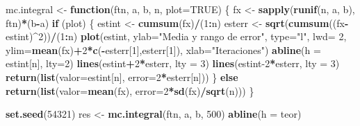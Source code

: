 \documentclass[
]{book}
\newenvironment{Shaded}{\begin{snugshade}}{\end{snugshade}}
\newcommand{\ControlFlowTok}[1]{\textcolor[rgb]{0.13,0.29,0.53}{\textbf{#1}}}
\newcommand{\DataTypeTok}[1]{\textcolor[rgb]{0.13,0.29,0.53}{#1}}
\newcommand{\DecValTok}[1]{\textcolor[rgb]{0.00,0.00,0.81}{#1}}
\newcommand{\KeywordTok}[1]{\textcolor[rgb]{0.13,0.29,0.53}{\textbf{#1}}}
\newcommand{\NormalTok}[1]{#1}
\newcommand{\OperatorTok}[1]{\textcolor[rgb]{0.81,0.36,0.00}{\textbf{#1}}}
\newcommand{\OtherTok}[1]{\textcolor[rgb]{0.56,0.35,0.01}{#1}}
\newcommand{\StringTok}[1]{\textcolor[rgb]{0.31,0.60,0.02}{#1}}
\theoremstyle{break}
\theoremstyle{definition}
\theoremstyle{definition}
\theoremstyle{definition}
\theoremstyle{remark}
\begin{document}
\begin{Shaded}
\begin{Highlighting}[]
\NormalTok{mc.integral <-}\StringTok{ }\ControlFlowTok{function}\NormalTok{(ftn, a, b, n, }\DataTypeTok{plot=}\OtherTok{TRUE}\NormalTok{) \{}
\NormalTok{  fx <-}\StringTok{ }\KeywordTok{sapply}\NormalTok{(}\KeywordTok{runif}\NormalTok{(n, a, b), ftn)}\OperatorTok{*}\NormalTok{(b}\OperatorTok{-}\NormalTok{a)}
  \ControlFlowTok{if}\NormalTok{ (plot) \{}
\NormalTok{    estint <-}\StringTok{ }\KeywordTok{cumsum}\NormalTok{(fx)}\OperatorTok{/}\NormalTok{(}\DecValTok{1}\OperatorTok{:}\NormalTok{n)}
\NormalTok{    esterr <-}\StringTok{ }\KeywordTok{sqrt}\NormalTok{(}\KeywordTok{cumsum}\NormalTok{((fx}\OperatorTok{-}\NormalTok{estint)}\OperatorTok{^}\DecValTok{2}\NormalTok{))}\OperatorTok{/}\NormalTok{(}\DecValTok{1}\OperatorTok{:}\NormalTok{n)}
    \KeywordTok{plot}\NormalTok{(estint, }\DataTypeTok{ylab=}\StringTok{"Media y rango de error"}\NormalTok{, }\DataTypeTok{type=}\StringTok{"l"}\NormalTok{, }\DataTypeTok{lwd=} \DecValTok{2}\NormalTok{, }
         \DataTypeTok{ylim=}\KeywordTok{mean}\NormalTok{(fx)}\OperatorTok{+}\DecValTok{2}\OperatorTok{*}\KeywordTok{c}\NormalTok{(}\OperatorTok{-}\NormalTok{esterr[}\DecValTok{1}\NormalTok{],esterr[}\DecValTok{1}\NormalTok{]), }\DataTypeTok{xlab=}\StringTok{"Iteraciones"}\NormalTok{)}
    \KeywordTok{abline}\NormalTok{(}\DataTypeTok{h =}\NormalTok{ estint[n], }\DataTypeTok{lty=}\DecValTok{2}\NormalTok{)}
    \KeywordTok{lines}\NormalTok{(estint}\OperatorTok{+}\DecValTok{2}\OperatorTok{*}\NormalTok{esterr, }\DataTypeTok{lty =} \DecValTok{3}\NormalTok{)}
    \KeywordTok{lines}\NormalTok{(estint}\DecValTok{-2}\OperatorTok{*}\NormalTok{esterr, }\DataTypeTok{lty =} \DecValTok{3}\NormalTok{)}
    \KeywordTok{return}\NormalTok{(}\KeywordTok{list}\NormalTok{(}\DataTypeTok{valor=}\NormalTok{estint[n], }\DataTypeTok{error=}\DecValTok{2}\OperatorTok{*}\NormalTok{esterr[n]))  }
\NormalTok{  \} }\ControlFlowTok{else} \KeywordTok{return}\NormalTok{(}\KeywordTok{list}\NormalTok{(}\DataTypeTok{valor=}\KeywordTok{mean}\NormalTok{(fx), }\DataTypeTok{error=}\DecValTok{2}\OperatorTok{*}\KeywordTok{sd}\NormalTok{(fx)}\OperatorTok{/}\KeywordTok{sqrt}\NormalTok{(n)))}
\NormalTok{\}  }

\KeywordTok{set.seed}\NormalTok{(}\DecValTok{54321}\NormalTok{)}
\NormalTok{res <-}\StringTok{ }\KeywordTok{mc.integral}\NormalTok{(ftn, a, b, }\DecValTok{500}\NormalTok{)}
\KeywordTok{abline}\NormalTok{(}\DataTypeTok{h =}\NormalTok{ teor)}
\end{Highlighting}
\end{Shaded}
\end{document}
